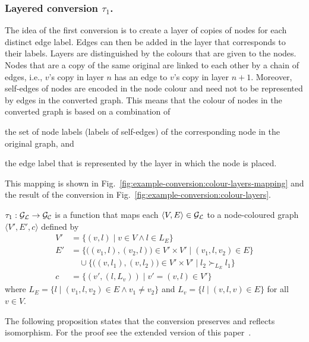 \subsubsection{%
\texorpdfstring{Layered conversion $\tau_1$.}%
{Layered conversion tau 1}}
%
The idea of the first conversion is to create a layer of copies of nodes for
each distinct edge label. Edges can then be added in the layer that corresponds
to their labels. Layers are distinguished by the colours that are given to the
nodes. Nodes that are a copy of the same original are linked to each other by a
chain of edges, i.e., $v$'s copy in layer $n$ has an edge to $v$'s copy in
layer $n+1$. Moreover, self-edges of nodes are encoded in the node colour and
need not to be represented by edges in the converted graph. This means that the
colour of nodes in the converted graph is based on a combination of
\begin{inparaenum}
\item the set of node labels (labels of self-edges) of the corresponding node
in the original graph, and
\item the edge label that is represented by the layer in which the node is
placed.
\end{inparaenum}
This mapping is shown in
Fig.~\ref{fig:example-conversion:colour-layers-mapping} and the result of the
conversion in Fig.~\ref{fig:example-conversion:colour-layers}.

\begin{definition}
\label{def:conversion-layered}
$\tau_1 : \mathcal{G_L} \to \mathcal{G_C}$ is a  function that maps each $\langle
V,E\rangle \in \mathcal{G_L}$ to a
node-coloured graph $\langle V', E', c \rangle$ defined by
\begin{align*}
V'& = \{ (v,l) \mid v \in V \land l \in L_E \} \\
E'& = \{ \bigl((v_1,l),(v_2,l)\bigr) \in V' \times V' \mid (v_1,l,v_2) \in E \} \\
  & \quad {} \cup \{ \bigl((v,l_1),(v,l_2)\bigr) \in V' \times V' \mid
l_2 \succ_{L_E} l_1 \} \\
c& = \{ (v', (l,L_v)) \mid v'=(v,l) \in V' \}
\end{align*}
where $L_E = \{ l \mid (v_1,l,v_2) \in E \land v_1 \neq v_2 \}$ and $L_v = \{ l
\mid (v,l,v) \in E \}$ for all $v\in V$.
\end{definition}
%
The following proposition states that the conversion preserves and reflects
isomorphism. For the proof see the extended version of this
paper~\cite{kant2010:canonical}.

